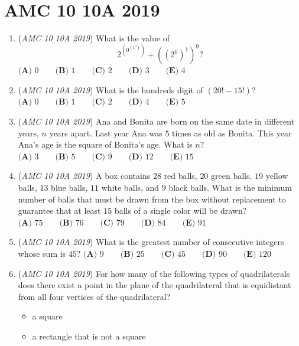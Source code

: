 \section{AMC 10 10A 2019}
        \begin{enumerate}
        	\item (\textit{AMC 10 10A 2019}) What is the value of 
 \[2^{\left(0^{\left(1^9\right)}\right)}+\left(\left(2^0\right)^1\right)^9?\]
$\textbf{(A) } 0 \qquad\textbf{(B) } 1 \qquad\textbf{(C) } 2 \qquad\textbf{(D) } 3 \qquad\textbf{(E) } 4$


	\item (\textit{AMC 10 10A 2019}) What is the hundreds digit of $(20!-15!)?$
$\textbf{(A) }0\qquad\textbf{(B) }1\qquad\textbf{(C) }2\qquad\textbf{(D) }4\qquad\textbf{(E) }5$


	\item (\textit{AMC 10 10A 2019}) Ana and Bonita are born on the same date in different years, $n$ years apart. Last year Ana was $5$ times as old as Bonita. This year Ana's age is the square of Bonita's age. What is $n?$
$\textbf{(A) } 3 \qquad\textbf{(B) } 5 \qquad\textbf{(C) } 9 \qquad\textbf{(D) } 12 \qquad\textbf{(E) } 15$


	\item (\textit{AMC 10 10A 2019}) A box contains $28$ red balls, $20$ green balls, $19$ yellow balls, $13$ blue balls, $11$ white balls, and $9$ black balls. What is the minimum number of balls that must be drawn from the box without replacement to guarantee that at least $15$ balls of a single color will be drawn$?$
$\textbf{(A) } 75 \qquad\textbf{(B) } 76 \qquad\textbf{(C) } 79 \qquad\textbf{(D) } 84 \qquad\textbf{(E) } 91$


	\item (\textit{AMC 10 10A 2019}) What is the greatest number of consecutive integers whose sum is $45?$
$\textbf{(A) } 9 \qquad\textbf{(B) } 25 \qquad\textbf{(C) } 45 \qquad\textbf{(D) } 90 \qquad\textbf{(E) } 120$


	\item (\textit{AMC 10 10A 2019}) For how many of the following types of quadrilaterals does there exist a point in the plane of the quadrilateral that is equidistant from all four vertices of the quadrilateral?


 
            \begin{itemize}
        \item a square

        \item a rectangle that is not a square


\end{itemize}
\end{enumerate}
